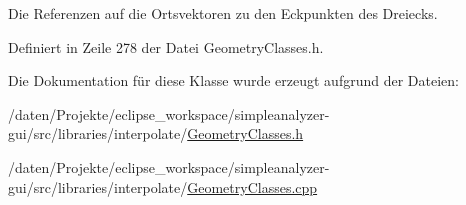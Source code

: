 Die Referenzen auf die Ortsvektoren zu den Eckpunkten des Dreiecks. 



Definiert in Zeile 278 der Datei Geometry\-Classes.\-h.



Die Dokumentation für diese Klasse wurde erzeugt aufgrund der Dateien\-:\begin{DoxyCompactItemize}
\item 
/daten/\-Projekte/eclipse\-\_\-workspace/simpleanalyzer-\/gui/src/libraries/interpolate/\hyperlink{GeometryClasses_8h}{Geometry\-Classes.\-h}\item 
/daten/\-Projekte/eclipse\-\_\-workspace/simpleanalyzer-\/gui/src/libraries/interpolate/\hyperlink{GeometryClasses_8cpp}{Geometry\-Classes.\-cpp}\end{DoxyCompactItemize}
